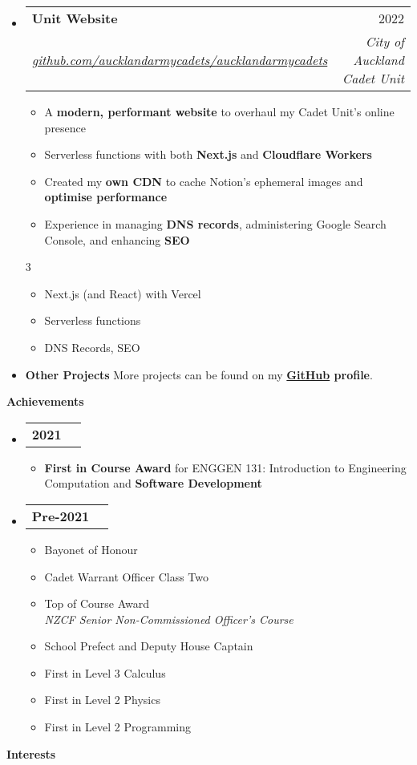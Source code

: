 \documentclass[11pt,a4paper]{article}[leftmargin=*]
\makeatletter
\def \entryspacing {-0pt}
\renewcommand{\section}[2]{\vspace{5pt}
  \colorbox{secondary}{\color{white}\raggedbottom\normalsize\textbf{{#1}{\hspace{2pt}#2}}}
}
\newcommand{\resumeEntryStart}{\begin{itemize}[leftmargin=2.5mm]}
\newcommand{\resumeEntryEnd}{\end{itemize}\vspace{\entryspacing}}
\newcommand{\resumeItemListStart}{\begin{itemize}[leftmargin=4.5mm]}
\newcommand{\resumeItemListEnd}{\end{itemize}}
\newcommand{\resumeItemListStartColumns}[2][-0.5]{\vspace*{#1\multicolsep}
\begin{multicols}{#2}\begin{itemize}[leftmargin=4.5mm]}
\newcommand{\resumeItemListEndColumns}[1][-0.5]{\end{itemize}\end{multicols}\vspace*{#1\multicolsep}}
\newcommand{\resumeItem}[1]{
  \item\small{
    {#1 \vspace{-2pt}}
  }
}
\newcommand{\resumeEntryTSDL}[4]{
  \vspace{-1pt}\item[]
    \begin{tabularx}{0.97\textwidth}{X@{\hspace{60pt}}r}
      \textbf{\color{primary}#1} & {\firabook\color{accent}\small#2} \\
      \textit{\color{accent}\small#3} & \textit{\color{accent}\small#4} \\
    \end{tabularx}\vspace{-6pt}
}
\newcommand{\resumeEntryTD}[2]{
  \vspace{-1pt}\item[]
    \begin{tabularx}{0.97\textwidth}{X@{\hspace{60pt}}r}
      \textbf{\color{primary}#1} & {\firabook\color{accent}\small#2} \\
    \end{tabularx}\vspace{-6pt}
}
\newcommand{\resumeEntryS}[2]{
  \item[]\small{
    \textbf{\color{primary}#1 }{ #2 \vspace{-4pt}}
  }
}
\newcommand{\resumeIt}[1]{\textit{\color{accent}#1}}
\newcommand{\resumeBf}[1]{\small\textbf{\color{halfbold}#1}}
\makeatother
\begin{document}
\resumeEntryStart
\resumeEntryTSDL
{Unit Website}{2022}
{\href{https://github.com/aucklandarmycadets/aucklandarmycadets}{github.com/aucklandarmycadets/aucklandarmycadets}}{City of Auckland Cadet Unit}
\resumeItemListStart
\resumeItem {A \resumeBf{modern, performant website} to overhaul my Cadet Unit's online presence}
\resumeItem {Serverless functions with both \resumeBf{Next.js} and \resumeBf{Cloudflare Workers}}
\resumeItem {Created my \resumeBf{own CDN} to cache Notion's ephemeral images and \resumeBf{optimise performance}}
\resumeItem {Experience in managing \resumeBf{DNS records}, administering Google Search Console, and enhancing \resumeBf{SEO}}
\resumeItemListEnd
\resumeItemListStartColumns{3}
\resumeItem {Next.js (and React) with Vercel}
\resumeItem {Serverless functions}
\resumeItem {DNS Records, SEO}
\resumeItemListEndColumns
\resumeEntryEnd

\resumeEntryStart
\resumeEntryS
{Other Projects}{More projects can be found on my \resumeBf{\href{https://github.com/jamesnzl}{GitHub} profile}.}
\resumeEntryEnd


\section{\faTrophy}{Achievements}

\resumeEntryStart
\resumeEntryTD{2021}{}
\resumeItemListStart
\resumeItem {\resumeBf{First in Course Award} for ENGGEN 131: Introduction to Engineering Computation and \resumeBf{Software Development}}
\resumeItemListEnd
\resumeEntryEnd

\resumeEntryStart
\resumeEntryTD{Pre-2021}{}
\begin{multicols}{2}
  \resumeItemListStart
  \resumeItem {Bayonet of Honour}
  \resumeItem {Cadet Warrant Officer Class Two}
  \resumeItem {Top of Course Award\\\resumeIt{NZCF Senior Non-Commissioned Officer's Course}}
  \resumeItem {School Prefect and Deputy House Captain}
  \resumeItem {First in Level 3 Calculus}
  \resumeItem {First in Level 2 Physics}
  \resumeItem {First in Level 2 Programming}
  \resumeItemListEnd
\end{multicols}
\resumeEntryEnd


\section{\faUserCircle}{Interests}
\end{document}
